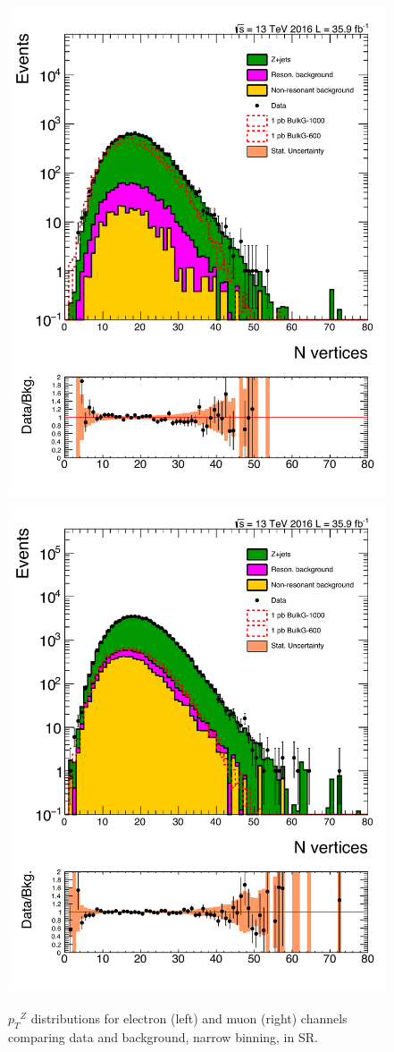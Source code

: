 \begin{figure}[htbp!]
\centering
\includegraphics[width=0.46\linewidth,page=10]{figures/ReMiniSummer16_DT_PhReMiniMCRcFixXsec_GMCPhPtWt_SRdPhiGT0p5_puWeightsummer16_muoneg_gjet_metfilter_unblind_el_log_1pb.pdf}
\includegraphics[width=0.46\linewidth,page=10]{figures/ReMiniSummer16_DT_PhReMiniMCRcFixXsec_GMCPhPtWt_SRdPhiGT0p5_puWeightsummer16_muoneg_gjet_metfilter_unblind_mu_log_1pb.pdf}
\caption{${p_T}^Z$ distributions for electron (left) and muon (right) channels
comparing data and background, 
narrow binning, in SR.}
\label{fig:SR_gjet_zpt_narrow}
\end{figure}

